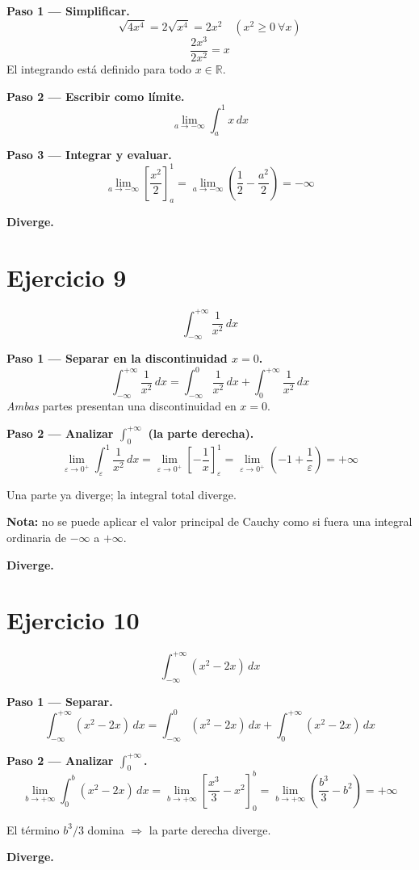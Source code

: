 \documentclass[12pt,a4paper]{article}
\newcommand{\diverge}{%
  \textcolor{divcolor}{\textbf{Diverge.}}%
}
\begin{document}
\textbf{Paso 1 — Simplificar.}
\[
  \sqrt{4x^4} = 2\sqrt{x^4} = 2x^2 \quad (x^2 \geq 0\ \forall x)
\]
\[
  \frac{2x^3}{2x^2} = x
\]
El integrando está definido para todo $x \in \mathbb{R}$.

\textbf{Paso 2 — Escribir como límite.}
\[
  \lim_{a\to-\infty}\int_{a}^{1} x\,dx
\]

\textbf{Paso 3 — Integrar y evaluar.}
\[
  \lim_{a\to-\infty}\left[\frac{x^2}{2}\right]_{a}^{1}
  = \lim_{a\to-\infty}\left(\frac{1}{2} - \frac{a^2}{2}\right)
  = -\infty
\]

\medskip\diverge

\bigskip
\section*{Ejercicio 9}
\[
  \int_{-\infty}^{+\infty} \frac{1}{x^2}\,dx
\]

\textbf{Paso 1 — Separar en la discontinuidad $x=0$.}
\[
  \int_{-\infty}^{+\infty} \frac{1}{x^2}\,dx
  = \int_{-\infty}^{0} \frac{1}{x^2}\,dx + \int_{0}^{+\infty} \frac{1}{x^2}\,dx
\]
\emph{Ambas} partes presentan una discontinuidad en $x=0$.

\textbf{Paso 2 — Analizar $\int_{0}^{+\infty}$ (la parte derecha).}
\[
  \lim_{\varepsilon\to 0^+}\int_{\varepsilon}^{1}\frac{1}{x^2}\,dx
  = \lim_{\varepsilon\to 0^+}\left[-\frac{1}{x}\right]_{\varepsilon}^{1}
  = \lim_{\varepsilon\to 0^+}\left(-1+\frac{1}{\varepsilon}\right)
  = +\infty
\]

Una parte ya diverge; la integral total diverge.

\textbf{Nota:} no se puede aplicar el valor principal de Cauchy como si fuera una integral ordinaria de $-\infty$ a $+\infty$.

\medskip\diverge

\bigskip
\section*{Ejercicio 10}
\[
  \int_{-\infty}^{+\infty} (x^2 - 2x)\,dx
\]

\textbf{Paso 1 — Separar.}
\[
  \int_{-\infty}^{+\infty}(x^2-2x)\,dx
  = \int_{-\infty}^{0}(x^2-2x)\,dx + \int_{0}^{+\infty}(x^2-2x)\,dx
\]

\textbf{Paso 2 — Analizar $\int_{0}^{+\infty}$.}
\[
  \lim_{b\to+\infty}\int_{0}^{b}(x^2-2x)\,dx
  = \lim_{b\to+\infty}\left[\frac{x^3}{3}-x^2\right]_{0}^{b}
  = \lim_{b\to+\infty}\left(\frac{b^3}{3}-b^2\right)
  = +\infty
\]

El término $b^3/3$ domina $\Rightarrow$ la parte derecha diverge.

\medskip\diverge
\end{document}
